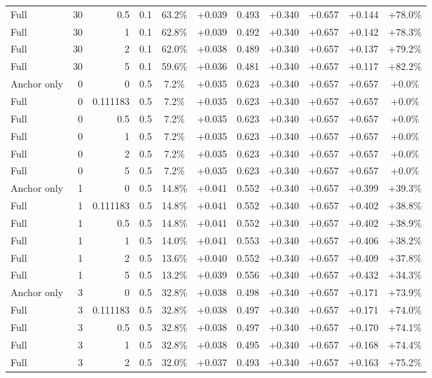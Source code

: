 \begin{table}[htbp]
\begin{tabular}{lrrrccccccc}
Full & 30 & 0.5 & 0.1 & 63.2\% & +0.039 & 0.493 & +0.340 & +0.657 & +0.144 & +78.0\% \\
Full & 30 & 1 & 0.1 & 62.8\% & +0.039 & 0.492 & +0.340 & +0.657 & +0.142 & +78.3\% \\
Full & 30 & 2 & 0.1 & 62.0\% & +0.038 & 0.489 & +0.340 & +0.657 & +0.137 & +79.2\% \\
Full & 30 & 5 & 0.1 & 59.6\% & +0.036 & 0.481 & +0.340 & +0.657 & +0.117 & +82.2\% \\
Anchor only & 0 & 0 & 0.5 & 7.2\% & +0.035 & 0.623 & +0.340 & +0.657 & +0.657 & +0.0\% \\
Full & 0 & 0.111183 & 0.5 & 7.2\% & +0.035 & 0.623 & +0.340 & +0.657 & +0.657 & +0.0\% \\
Full & 0 & 0.5 & 0.5 & 7.2\% & +0.035 & 0.623 & +0.340 & +0.657 & +0.657 & +0.0\% \\
Full & 0 & 1 & 0.5 & 7.2\% & +0.035 & 0.623 & +0.340 & +0.657 & +0.657 & +0.0\% \\
Full & 0 & 2 & 0.5 & 7.2\% & +0.035 & 0.623 & +0.340 & +0.657 & +0.657 & +0.0\% \\
Full & 0 & 5 & 0.5 & 7.2\% & +0.035 & 0.623 & +0.340 & +0.657 & +0.657 & +0.0\% \\
Anchor only & 1 & 0 & 0.5 & 14.8\% & +0.041 & 0.552 & +0.340 & +0.657 & +0.399 & +39.3\% \\
Full & 1 & 0.111183 & 0.5 & 14.8\% & +0.041 & 0.552 & +0.340 & +0.657 & +0.402 & +38.8\% \\
Full & 1 & 0.5 & 0.5 & 14.8\% & +0.041 & 0.552 & +0.340 & +0.657 & +0.402 & +38.9\% \\
Full & 1 & 1 & 0.5 & 14.0\% & +0.041 & 0.553 & +0.340 & +0.657 & +0.406 & +38.2\% \\
Full & 1 & 2 & 0.5 & 13.6\% & +0.040 & 0.552 & +0.340 & +0.657 & +0.409 & +37.8\% \\
Full & 1 & 5 & 0.5 & 13.2\% & +0.039 & 0.556 & +0.340 & +0.657 & +0.432 & +34.3\% \\
Anchor only & 3 & 0 & 0.5 & 32.8\% & +0.038 & 0.498 & +0.340 & +0.657 & +0.171 & +73.9\% \\
Full & 3 & 0.111183 & 0.5 & 32.8\% & +0.038 & 0.497 & +0.340 & +0.657 & +0.171 & +74.0\% \\
Full & 3 & 0.5 & 0.5 & 32.8\% & +0.038 & 0.497 & +0.340 & +0.657 & +0.170 & +74.1\% \\
Full & 3 & 1 & 0.5 & 32.8\% & +0.038 & 0.495 & +0.340 & +0.657 & +0.168 & +74.4\% \\
Full & 3 & 2 & 0.5 & 32.0\% & +0.037 & 0.493 & +0.340 & +0.657 & +0.163 & +75.2\% \\

\end{tabular}
\end{table}
